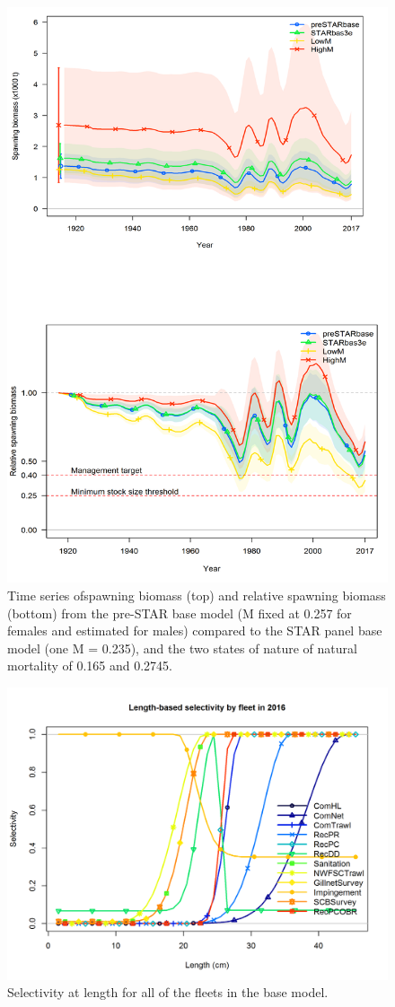\documentclass[12pt,]{article}
\begin{document}
\begin{figure}[htbp]
\centering
\includegraphics[height=0.90000\textwidth]{Figures/Request12.png}
\caption{Time series ofspawning biomass (top) and relative spawning
biomass (bottom) from the pre-STAR base model (M fixed at 0.257 for
females and estimated for males) compared to the STAR panel base model
(one M = 0.235), and the two states of nature of natural mortality of
0.165 and 0.2745. \label{fig:Request12}}
\end{figure}

\FloatBarrier

\FloatBarrier

\FloatBarrier

\begin{figure}[htbp]
\centering
\includegraphics{r4ss/plots_mod1/sel01_multiple_fleets_length1.png}
\caption{Selectivity at length for all of the fleets in the base model.
\label{fig:sel01_multiple_fleets_length1}}
\end{figure}
\end{document}
